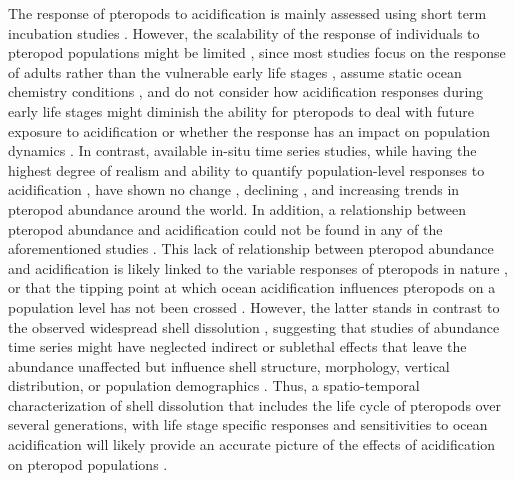 The response of pteropods to acidification is mainly assessed using short term incubation studies \citep[less than one month; ][]{Manno2017ReviewPteropodVulnerability,Doo2020Attribution}. However, the scalability of the response of individuals to pteropod populations might be limited \citep{Doo2020Attribution,Andersson2015LabPopulation}, since most studies focus on the response of adults rather than the vulnerable early life stages \citep{Ross2011early,Busch2016directEffects}, assume static ocean chemistry conditions \citep{Bednarsek2019MetaAnalysis}, and do not consider how acidification responses during early life stages might diminish the ability for pteropods to deal with future exposure to acidification \citep{Bednarsek2017ExposureHistory} or whether the response has an impact on population dynamics \citep{Andersson2015LabPopulation,Busch2015Uncertainties}.
In contrast, available in-situ time series studies, while having the highest degree of realism and ability to quantify population-level responses to acidification \citep{Andersson2015LabPopulation}, have shown no change \citep{Ohman2009Multi,Head2010NWAtlantic,Thibodeau2018WAP}, declining \citep{Beaugrand2012NAtlantic,Beare2013NorthSea,Mackas2011Timeseries}, and increasing \citep{Howes2015Mediterranean} trends in pteropod abundance around the world. In addition, a relationship between pteropod abundance and acidification could not be found in any of the aforementioned studies \citep{Doo2020Attribution}. This lack of relationship between pteropod abundance and acidification is likely linked to the variable responses of pteropods in nature \citep{Bednarsek2016CumulativeEffects}, or that the tipping point at which ocean acidification influences pteropods on a population level has not been crossed \citep{Mackas2011Timeseries,Doo2020Attribution}. However, the latter stands in contrast to the observed widespread shell dissolution \citep{Bednarsek2015VerticalDistribution}, suggesting that studies of abundance time series might have neglected indirect or sublethal effects that leave the abundance unaffected but influence shell structure, morphology, vertical distribution, or population demographics \citep{Ohman2009Multi,Bednarsek2015VerticalDistribution,Manno2017ReviewPteropodVulnerability,Bednarsek2019MetaAnalysis,Doo2020Attribution}. Thus, a spatio-temporal characterization of shell dissolution that includes the life cycle of pteropods over several generations, with life stage specific responses and sensitivities to ocean acidification  will likely provide an accurate picture of the effects of acidification on pteropod populations \citep{Johnson2016,Bednarsek2016CumulativeEffects,Manno2017ReviewPteropodVulnerability,Bednarsek2019MetaAnalysis}. 



